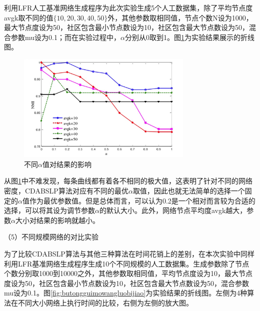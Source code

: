 利用LFR人工基准网络生成程序为此次实验生成5个人工数据集，除了平均节点度avgk取不同的值$ \{ 10,20,30,40,50 \} $外，其他参数取相同值，节点个数N设为1000，最大节点度设为50，社区包含最小节点数设为10，社区包含最大节点数设为50，混合参数mu设为0.1；而在实验过程中，$\alpha$分别从0取到1。图\ref{fig:alpha}为实验结果展示的折线图。

\begin{figure}
  \centering
  \includegraphics[width=0.75\textwidth]{figures/alpha}
  \caption{不同$\alpha$值对结果的影响}\label{fig:alpha}
\end{figure}

从图\ref{fig:alpha}中不难发现，每条曲线都有着各不相同的极大值，这表明了针对不同的网络密度，CDABSLP算法对应有不同的最优$\alpha$取值，因此也就无法简单的选择一个固定的$\alpha$值作为最优参数值。但是总体而言，可以认为0.2是一个相对而言较为合适的选择，可以将其设为调节参数$\alpha$的默认大小。此外，网络节点平均度avgk越大，参数$\alpha$大小对结果的影响就越小。

（5）不同规模网络的对比实验

为了比较CDABSLP算法与其他三种算法在时间花销上的差别，在本次实验中同样利用LFR基准网络生成程序生成10个不同规模的人工数据集。生成参数除了节点个数分别取1000到10000之外，其他参数取相同值，平均节点度设为10，最大节点度设为50，社区包含最小节点数设为10，社区包含最大节点数设为50，混合参数mu设为0.1。图\ref{fig:butongguimowangluobijiao}为实验结果的折线图。左侧为4种算法在不同大小网络上执行时间的比较，右侧为左侧的放大图。

